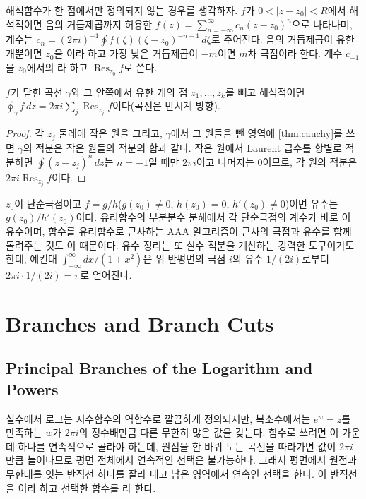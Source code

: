 해석함수가 한 점에서만 정의되지 않는 경우를 생각하자. $f$가 $0<|z-z_0|<R$에서 해석적이면 음의 거듭제곱까지 허용한  $f(z)=\sum_{n=-\infty}^{\infty}c_n(z-z_0)^n$으로 나타나며, 계수는 $c_n=(2\pi i)^{-1}\oint f(\zeta)(\zeta-z_0)^{-n-1}\,d\zeta$로 주어진다. 음의 거듭제곱이 유한 개뿐이면 $z_0$을 이라 하고 가장 낮은 거듭제곱이 $-m$이면 $m$차 극점이라 한다. 계수 $c_{-1}$을 $z_0$에서의 라 하고 $\operatorname{Res}_{z_0}f$로 쓴다.

\begin{theorem}[유수 정리]
\label{thm:residue}
$f$가 닫힌 곡선 $\gamma$와 그 안쪽에서 유한 개의 점 $z_1,\dots,z_k$를 빼고 해석적이면 $\oint_\gamma f\,dz=2\pi i\sum_j\operatorname{Res}_{z_j}f$이다(곡선은 반시계 방향).
\end{theorem}

\begin{proof}
각 $z_j$ 둘레에 작은 원을 그리고, $\gamma$에서 그 원들을 뺀 영역에 \cref{thm:cauchy}를 쓰면 $\gamma$의 적분은 작은 원들의 적분의 합과 같다. 작은 원에서 Laurent 급수를 항별로 적분하면 $\oint(z-z_j)^n\,dz$는 $n=-1$일 때만 $2\pi i$이고 나머지는 $0$이므로, 각 원의 적분은 $2\pi i\operatorname{Res}_{z_j}f$이다.
\end{proof}

$z_0$이 단순극점이고 $f=g/h$($g(z_0)\ne0$, $h(z_0)=0$, $h'(z_0)\ne0$)이면 유수는 $g(z_0)/h'(z_0)$이다. 유리함수의 부분분수 분해에서 각 단순극점의 계수가 바로 이 유수이며, 함수를 유리함수로 근사하는 AAA 알고리즘이 근사의 극점과 유수를 함께 돌려주는 것도 이 때문이다. 유수 정리는 또 실수 적분을 계산하는 강력한 도구이기도 한데, 예컨대 $\int_{-\infty}^\infty dx/(1+x^2)$은 위 반평면의 극점 $i$의 유수 $1/(2i)$로부터 $2\pi i\cdot1/(2i)=\pi$로 얻어진다.

\section{Branches and Branch Cuts}
\label{sec:branches}

\subsection{Principal Branches of the Logarithm and Powers}

실수에서 로그는 지수함수의 역함수로 깔끔하게 정의되지만, 복소수에서는 $e^{w}=z$를 만족하는 $w$가 $2\pi i$의 정수배만큼 다른 무한히 많은 값을 갖는다. 함수로 쓰려면 이 가운데 하나를 연속적으로 골라야 하는데, 원점을 한 바퀴 도는 곡선을 따라가면 값이 $2\pi i$만큼 늘어나므로 평면 전체에서 연속적인 선택은 불가능하다. 그래서 평면에서 원점과 무한대를 잇는 반직선 하나를 잘라 내고 남은 영역에서 연속인 선택을 한다. 이 반직선을 이라 하고 선택한 함수를 라 한다.

